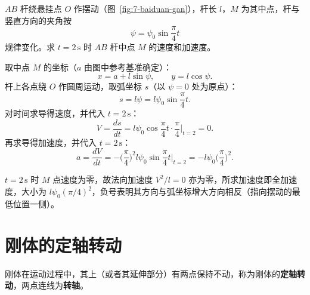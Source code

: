 \begin{longexample}[$t=2\,\mathrm{s}$ 时 $AB$ 杆中点 $M$ 的速度和加速度]
$AB$ 杆绕悬挂点 $O$ 作摆动（图~\ref{fig:7-baiduan-gan}），杆长 $l$，$M$ 为其中点，杆与竖直方向的夹角按
\begin{equation}\label{eq:7-li-psi}
	\psi=\psi_0\sin\frac{\pi}{4}t
\end{equation}
规律变化。求 $t=2\,\mathrm{s}$ 时 $AB$ 杆中点 $M$ 的速度和加速度。

\begin{solution}
取中点 $M$ 的坐标（$a$ 由图中参考基准确定）：
\begin{equation}\label{eq:7-li-m-zuobiao}
	x=a+l\sin\psi,\qquad y=l\cos\psi .
\end{equation}
杆上各点绕 $O$ 作圆周运动，取弧坐标 $s$（以 $\psi=0$ 处为原点）：
\begin{equation}\label{eq:7-li-s}
	s=l\psi=l\psi_0\sin\frac{\pi}{4}t .
\end{equation}
对时间求导得速度，并代入 $t=2\,\mathrm{s}$：
\begin{equation}\label{eq:7-li-v}
	V=\frac{ds}{dt}=l\psi_0\cos\frac{\pi}{4}t\cdot\frac{\pi}{4}\Big|_{t=2}=0 .
\end{equation}
再求导得加速度，并代入 $t=2\,\mathrm{s}$：
\begin{equation}\label{eq:7-li-a}
	a=\frac{dV}{dt}=-\Big(\frac{\pi}{4}\Big)^{2}l\psi_0\sin\frac{\pi}{4}t\bigg|_{t=2}=-l\psi_0\Big(\frac{\pi}{4}\Big)^{2} .
\end{equation}
\end{solution}

\begin{remark}
$t=2\,\mathrm{s}$ 时 $M$ 点速度为零，故法向加速度 $V^{2}/l=0$ 亦为零，所求加速度即全加速度，大小为 $l\psi_0(\pi/4)^{2}$，负号表明其方向与弧坐标增大方向相反（指向摆动的最低位置一侧）。
\end{remark}
\end{longexample}

\section{刚体的定轴转动}

\begin{definition}[定轴转动]
刚体在运动过程中，其上（或者其延伸部分）有两点保持不动，称为刚体的\textbf{定轴转动}，两点连线为\textbf{转轴}。
\end{definition}

